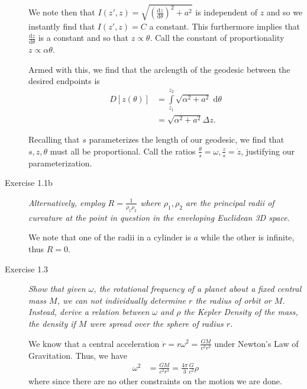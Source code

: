 \documentclass[12pt]{report}
\newcommand{\rd}[2]{\frac{\mathrm{d}#1}{\mathrm{d}#2}}
\begin{document}
\begin{description}
        We note then that
        $I(z', z) = \sqrt{\left(\rd{z}{\theta}\right)^2 + a^2}$ is independent
        of $z$ and so we instantly find that $I(z',z) = C$ a constant. This
        furthermore implies that $\rd{z}{\theta}$ is a constant and so that $z
        \propto \theta$. Call the constant of proportionality $z \propto \alpha
        \theta$.

        Armed with this, we find that the arclength of the geodesic between the
        desired endpoints is
        \begin{align}
            D[z(\theta)] &= \int\limits_{z_1}^{z_2}
                \sqrt{\alpha^2 + a^2}\;\mathrm{d}\theta\\
                &= \sqrt{\alpha^2 + a^2}\Delta z.
        \end{align}

        Recalling that $s$ parameterizes the length of our geodesic, we find
        that $s, z, \theta$ must all be proportional. Call the ratios
        $\frac{\theta}{s} = \omega, \frac{z}{s} = \dot{z}$, justifying our
        parameterization.

    \item[Exercise 1.1b] \emph{Alternatively, employ $R =
        \frac{1}{\rho_1\rho_2}$ where $\rho_1, \rho_2$ are the principal radii
        of curvature at the point in question in the enveloping Euclidean 3D
        space.}

        We note that one of the radii in a cylinder is $a$ while the other is
        infinite, thus $R=0$.

    \item[Exercise 1.3] \emph{Show that given $\omega$, the rotational frequency
        of a planet about a fixed central mass $M$, we can not individually
        determine $r$ the radius of orbit or $M$. Instead, derive a relation
        between $\omega$ and $\rho$ the \emph{Kepler Density} of the mass, the
        density if $M$ were spread over the sphere of radius $r$.}

        We know that a central acceleration $\ddot{r} = r\omega^2 =
        \frac{GM}{c^2r^2}$ under Newton's Law of Gravitation. Thus, we have
        \begin{align*}
            \omega^2 &= \frac{GM}{c^2r^3} = \frac{4\pi}{3}\frac{G}{c^2}\rho
        \end{align*}
        where since there are no other constraints on the motion we are done.
\end{description}
\end{document}
